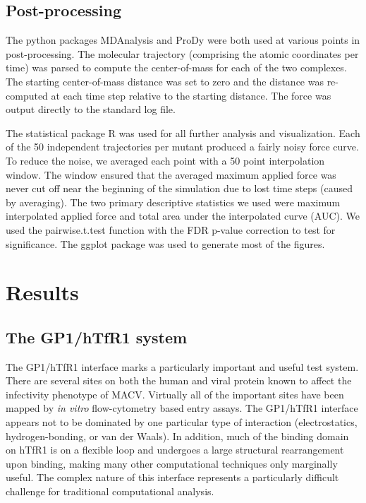 \documentclass[journal=jacsat,manuscript=article]{achemso}
\begin{document}
\subsection{Post-processing}

The python packages MDAnalysis \cite{Agrawal2011} and ProDy \cite{Bakan2011} were both used at various points in post-processing. The molecular trajectory (comprising the atomic coordinates per time) was parsed to compute the center-of-mass for each of the two complexes. The starting center-of-mass distance was set to zero and the distance was re-computed at each time step relative to the starting distance. The force was output directly to the standard log file.

The statistical package R was used for all further analysis and visualization. Each of the 50 independent trajectories per mutant produced a fairly noisy force curve. To reduce the noise, we averaged each point with a 50 point interpolation window. The window ensured that the averaged maximum applied force was never cut off near the beginning of the simulation due to lost time steps (caused by averaging). The two primary descriptive statistics we used were maximum interpolated applied force and total area under the interpolated curve (AUC). We used the pairwise.t.test function with the FDR p-value correction to test for significance. The ggplot \cite{ggplot} package was used to generate most of the figures. 

\section{Results}

\subsection{The GP1/hTfR1 system}
The GP1/hTfR1 interface marks a particularly important and useful test system. There are several sites on both the human and viral protein known to affect the infectivity phenotype of MACV. Virtually all of the important sites have been mapped by \textit{in vitro} flow-cytometry based entry assays. The GP1/hTfR1 interface appears not to be dominated by one particular type of interaction (electrostatics, hydrogen-bonding, or van der Waals). In addition, much of the binding domain on hTfR1 is on a flexible loop and undergoes a large structural rearrangement upon binding, making many other computational techniques \cite{Grant2011,Kortemme2004} only marginally useful. The complex nature of this interface represents a particularly difficult challenge for traditional computational analysis. 
\end{document}
